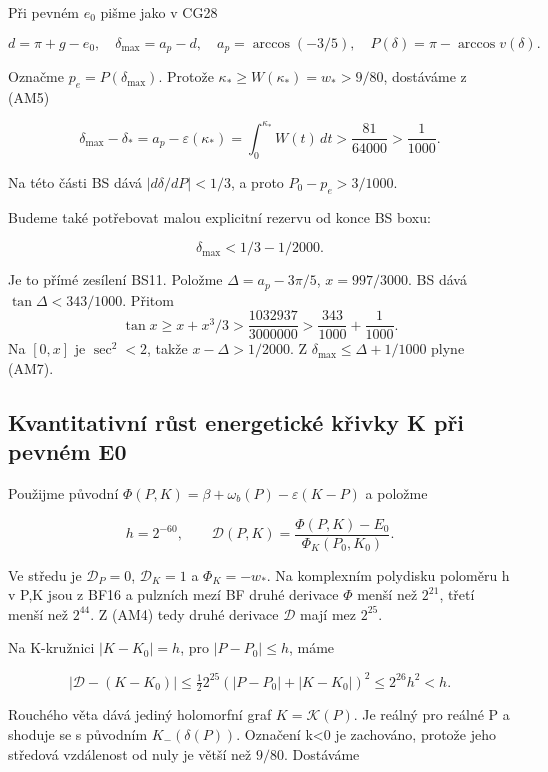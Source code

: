 \documentclass[11pt,a4paper]{article}
\theoremstyle{remark}\newtheorem{remark}[theorem]{Poznámka}
\numberwithin{equation}{section}
\begin{document}
Při pevném \(e_0\) pišme jako v CG28

\[
d=\pi+g-e_0,\quad \delta_{\max}=a_p-d,\quad
a_p=\arccos(-3/5),\quad
P(\delta)=\pi-\arccos v(\delta).
\]

Označme \(p_e=P(\delta_{\max})\). Protože
\(\kappa_*\ge W(\kappa_*)=w_*>9/80\), dostáváme z (AM5)

\[
\delta_{\max}-\delta_*
=a_p-\varepsilon(\kappa_*)
=\int_0^{\kappa_*}W(t)\,dt
>\frac{81}{64000}>\frac1{1000}.
\tag{AM6}
\]

Na této části BS dává \(|d\delta/dP|<1/3\), a proto \(P_0-p_e>3/1000\).

Budeme také potřebovat malou explicitní rezervu od konce BS boxu:

\[
\boxed{\delta_{\max}<1/3-1/2000.}
\tag{AM7}
\]

Je to přímé zesílení BS11. Položme \(\Delta=a_p-3\pi/5\),
\(x=997/3000\). BS dává \(\tan\Delta<343/1000\). Přitom \[
\tan x\ge x+x^3/3
>\frac{1032937}{3000000}
>\frac{343}{1000}+\frac1{1000}.
\] Na \([0,x]\) je \(\sec^2<2\), takže \(x-\Delta>1/2000\). Z
\(\delta_{\max}\le\Delta+1/1000\) plyne (AM7).

\hypertarget{kvantitativnuxed-rux16fst-energetickuxe9-kux159ivky-k-pux159i-pevnuxe9m-e0}{%
\subsection{Kvantitativní růst energetické křivky K při pevném
E0}\label{kvantitativnuxed-rux16fst-energetickuxe9-kux159ivky-k-pux159i-pevnuxe9m-e0}}

Použijme původní \(\Phi(P,K)=\beta+\omega_b(P)-\varepsilon(K-P)\) a
položme

\[
h=2^{-60},\qquad
\mathcal D(P,K)=\frac{\Phi(P,K)-E_0}{\Phi_K(P_0,K_0)}.
\tag{AM8}
\]

Ve středu je \(\mathcal D_P=0\), \(\mathcal D_K=1\) a \(\Phi_K=-w_*\).
Na komplexním polydisku poloměru h v P,K jsou z BF16 a pulzních mezí BF
druhé derivace \(\Phi\) menší než \(2^{21}\), třetí menší než
\(2^{44}\). Z (AM4) tedy druhé derivace \(\mathcal D\) mají mez
\(2^{25}\).

Na K-kružnici \(|K-K_0|=h\), pro \(|P-P_0|\le h\), máme

\[
|\mathcal D-(K-K_0)|
\le\tfrac12 2^{25}(|P-P_0|+|K-K_0|)^2
\le2^{26}h^2<h.
\tag{AM9}
\]

Rouchého věta dává jediný holomorfní graf \(K=\mathcal K(P)\). Je reálný
pro reálné P a shoduje se s původním \(K_-(\delta(P))\). Označení
k\textless0 je zachováno, protože jeho středová vzdálenost od nuly je
větší než \(9/80\). Dostáváme
\end{document}
